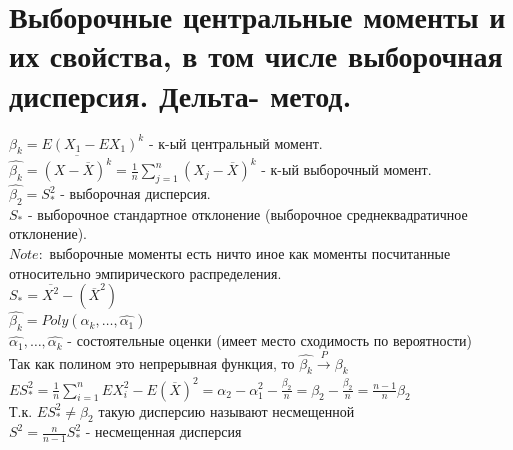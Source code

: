 \documentclass{article}
\newcommand\0{\mathbb{0}}
\newcommand\1{\mathbb{1}}
\begin{document}
\section{Выборочные центральные моменты и их свойства, в том числе выборочная дисперсия. Дельта-
метод.}
$\beta_k = E(X_1 - EX_1)^k$ - к-ый центральный момент.\\
$\widehat{\beta_k} = \overline{(X - \overline{X})^k} = \frac{1}{n}\displaystyle\sum_{j = 1}^{n} (X_j -\overline{X})^k$ - к-ый выборочный момент.\\
$\widehat{\beta_2} = S_{*}^2$ - выборочная дисперсия.\\
$S_{*}$ - выборочное стандартное отклонение (выборочное среднеквадратичное отклонение).\\
$Note:$ выборочные моменты есть ничто иное как моменты посчитанные относительно эмпирического распределения.\\
$S_{*} = \overline{X^2} - (\overline{X}^2)$\\
$\widehat{\beta_k} = Poly(\widehat{\alpha_k}, \dots, \widehat{\alpha_1})$\\
$\widehat{\alpha_1}, \dots, \widehat{\alpha_k}$ - состоятельные оценки (имеет место сходимость по вероятности)\\
Так как полином это непрерывная функция, то $\widehat{\beta_k} \xrightarrow[]{P} \beta_k$\\
$ES_*^2 = \frac{1}{n}\displaystyle\sum_{i = 1}^n EX_i^2 - E(\overline{X})^2 = \alpha_2 - \alpha_1^2 - \frac{\beta_2}{n} = \beta_2 - \frac{\beta_2}{n} = \frac{n - 1}{n}\beta_2$\\
Т.к. $ES_*^2 \neq \beta_2$ такую дисперсию называют несмещенной\\
$S^2 = \frac{n}{n - 1}S_*^2$ - несмещенная дисперсия
\end{document}
